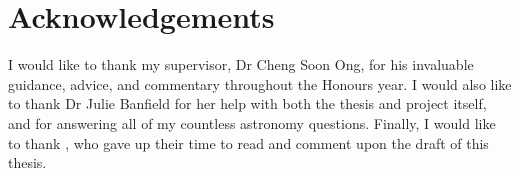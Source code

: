 
\chapter*{Acknowledgements}
\label{cha:ack}

    I would like to thank my supervisor, Dr Cheng Soon Ong, for his invaluable
    guidance, advice, and commentary throughout the Honours year. I would also
    like to thank Dr Julie Banfield for her help with both the thesis and
    project itself, and for answering all of my countless astronomy questions.
    Finally, I would like to thank , who gave up
    their time to read and comment upon the draft of this thesis.

